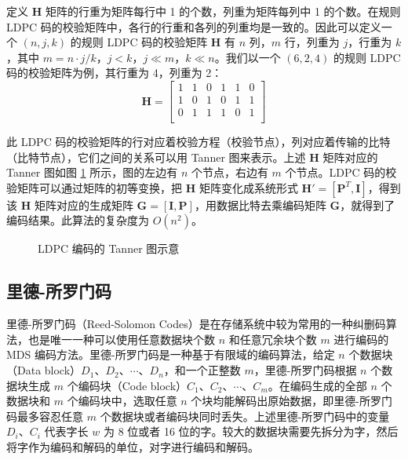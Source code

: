 定义 $\boldsymbol{H}$ 矩阵的行重为矩阵每行中 1 的个数，列重为矩阵每列中 1 的个数。在规则 LDPC 码的校验矩阵中，各行的行重和各列的列重均是一致的。因此可以定义一个 $(n,j,k)$ 的规则 LDPC 码的校验矩阵 $\boldsymbol{H}$ 有 $n$ 列，$m$ 行，列重为 $j$，行重为 $k$，其中 $m=n{\cdot}j/k$，$j<k$，$j{\ll}m$，$k{\ll}n$。我们以一个 $(6,2,4)$ 的规则 LDPC 码的校验矩阵为例，其行重为 4，列重为 2：
\begin{equation}
\boldsymbol{H}=
\begin{bmatrix}
1 & 1 & 0 & 1 & 1 & 0 \\
1 & 0 & 1 & 0 & 1 & 1 \\
0 & 1 & 1 & 1 & 0 & 1 \\
\end{bmatrix}
\end{equation}

此 LDPC 码的校验矩阵的行对应着校验方程（校验节点），列对应着传输的比特（比特节点），它们之间的关系可以用 Tanner 图\cite{tanner1981recursive}来表示。上述 $\boldsymbol{H}$ 矩阵对应的 Tanner 图如图 \ref{p13} 所示，图的左边有 $n$ 个节点，右边有 $m$ 个节点。LDPC 码的校验矩阵可以通过矩阵的初等变换，把 $\boldsymbol{H}$ 矩阵变化成系统形式 $\boldsymbol{H'}=[\boldsymbol{P}^T,\boldsymbol{I}]$，得到该 $\boldsymbol{H}$ 矩阵对应的生成矩阵 $\boldsymbol{G}=[\boldsymbol{I},\boldsymbol{P}]$，用数据比特去乘编码矩阵 $\boldsymbol{G}$，就得到了编码结果。此算法的复杂度为 $O(n^2)$。

\begin{figure}[!htb]
\centering
\resizebox{.8\textwidth}{!}{}
\caption{LDPC 编码的 Tanner 图示意}
\label{p13}
\end{figure}
\subsection{里德-所罗门码}
里德-所罗门码（Reed-Solomon Codes）\cite{reed1960polynomial}是在存储系统中较为常用的一种纠删码算法，也是唯一一种可以使用任意数据块个数 $n$ 和任意冗余块个数 $m$ 进行编码的 MDS 编码方法。里德-所罗门码是一种基于有限域的编码算法，给定 $n$ 个数据块（Data block）$D_1$、$D_2$、$\cdots$、$D_n$，和一个正整数 $m$，里德-所罗门码根据 $n$ 个数据块生成 $m$ 个编码块（Code block）$C_1$、$C_2$、$\cdots$、$C_m$。在编码生成的全部 $n$ 个数据块和 $m$ 个编码块中，选取任意 $n$ 个块均能解码出原始数据，即里德-所罗门码最多容忍任意 $m$ 个数据块或者编码块同时丢失。上述里德-所罗门码中的变量 $D_i$、$C_i$ 代表字长 $w$ 为 8 位或者 16 位的字。较大的数据块需要先拆分为字，然后将字作为编码和解码的单位，对字进行编码和解码。

